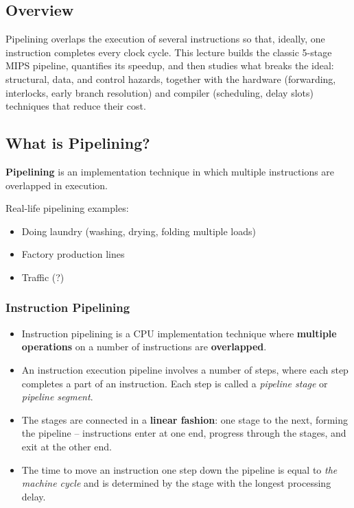 
\subsection{Overview}

Pipelining overlaps the execution of several instructions so that, ideally,
one instruction completes every clock cycle. This lecture builds the classic
5-stage MIPS pipeline, quantifies its speedup, and then studies what breaks
the ideal: structural, data, and control hazards, together with the hardware
(forwarding, interlocks, early branch resolution) and compiler (scheduling,
delay slots) techniques that reduce their cost.

\subsection{What is Pipelining?}

\begin{definition}[Pipelining]
\textbf{Pipelining} is an implementation technique in which multiple
instructions are overlapped in execution.
\end{definition}

Real-life pipelining examples:
\begin{itemize}
  \item Doing laundry (washing, drying, folding multiple loads)
  \item Factory production lines
  \item Traffic (?)
\end{itemize}

\subsubsection{Instruction Pipelining}

\begin{definition}
\leavevmode
\begin{itemize}
  \item Instruction pipelining is a CPU implementation technique where
  \textbf{multiple operations} on a number of instructions are \textbf{overlapped}.
  \item An instruction execution pipeline involves a number of steps, where each
  step completes a part of an instruction. Each step is called a \emph{pipeline
  stage} or \emph{pipeline segment}.
  \item The stages are connected in a \textbf{linear fashion}: one stage to the
  next, forming the pipeline -- instructions enter at one end, progress through
  the stages, and exit at the other end.
  \item The time to move an instruction one step down the pipeline is equal to
  \emph{the machine cycle} and is determined by the stage with the longest
  processing delay.
\end{itemize}
\end{definition}


